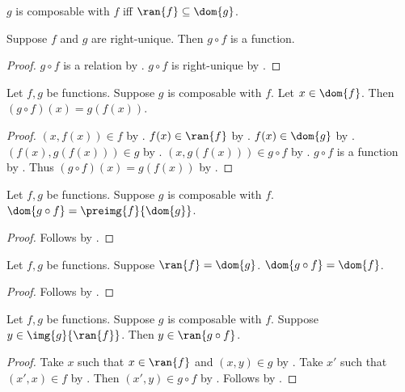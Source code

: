 \begin{abbreviation}\label{composable}
    $g$ is composable with $f$ iff $\ran{f}\subseteq \dom{g}$.
\end{abbreviation}

\begin{proposition}\label{function_circ}
    Suppose $f$ and $g$ are right-unique.
    Then $g\circ f$ is a function.
\end{proposition}
\begin{proof}
    $g\circ f$ is a relation by .
    $g\circ f$ is right-unique by .
\end{proof}

\begin{proposition}\label{circ_apply}
    Let $f, g$ be functions.
    Suppose $g$ is composable with $f$.
    Let $x\in\dom{f}$.
    Then $(g\circ f)(x) = g(f(x))$.
\end{proposition}
\begin{proof}
    $(x,f(x))\in f$ by .
    $f(x)\in\ran{f}$ by .
    $f(x)\in\dom{g}$ by .
    $(f(x),g(f(x)))\in g$ by .
    $(x, g(f(x)))\in g\circ f$ by .
    $g\circ f$ is a function by .
    Thus $(g\circ f)(x) = g(f(x))$ by .
\end{proof}

\begin{proposition}\label{dom_of_circ}
    Let $f, g$ be functions.
    Suppose $g$ is composable with $f$.
    $\dom{g\circ f} = \preimg{f}{\dom{g}}$.
\end{proposition}
\begin{proof}
    Follows by .
\end{proof}

\begin{proposition}\label{dom_circ_exact}
    Let $f, g$ be functions.
    Suppose $\ran{f} = \dom{g}$.
    $\dom{g\circ f} = \dom{f}$.
\end{proposition}
\begin{proof}
    Follows by .
\end{proof}

\begin{proposition}\label{ran_of_circ_intro}
    Let $f, g$ be functions.
    Suppose $g$ is composable with $f$.
    Suppose $y\in \img{g}{\ran{f}}$.
    Then $y\in \ran{g\circ f}$.
\end{proposition}
\begin{proof}
    Take $x$ such that $x\in\ran{f}$ and $(x, y)\in g$ by .
    Take $x'$ such that $(x', x)\in f$ by .
    Then $(x', y) \in g\circ f$ by .
    Follows by .
\end{proof}

